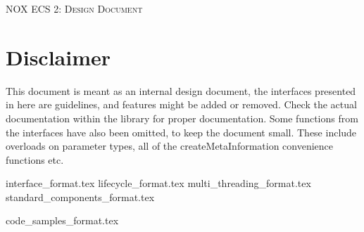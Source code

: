 \documentclass[hidelinks]{article}
\begin{document}
\begin{titlepage}
    \centering
    {\scshape\LARGE NOX ECS 2: Design Document \par}
    \vfill
    {\large \date{}\par}
\end{titlepage}

\tableofcontents
\pagebreak

\section{Disclaimer}
This document is meant as an internal design document,
the interfaces presented in here are guidelines, and features might be added or removed.
Check the actual documentation within the library for proper documentation.
Some functions from the interfaces have also been omitted, to keep the document small. 
These include overloads on parameter types, all of the createMetaInformation convenience functions etc.

{interface_format.tex}
\pagebreak
{lifecycle_format.tex}
\pagebreak
{multi_threading_format.tex}
\pagebreak
{standard_components_format.tex}
\pagebreak




\pagebreak
{code_samples_format.tex}
\end{document}
